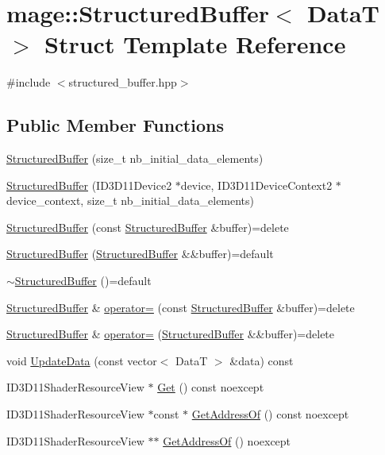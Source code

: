\hypertarget{structmage_1_1_structured_buffer}{}\section{mage\+:\+:Structured\+Buffer$<$ DataT $>$ Struct Template Reference}
\label{structmage_1_1_structured_buffer}


{\ttfamily \#include $<$structured\+\_\+buffer.\+hpp$>$}

\subsection*{Public Member Functions}
\begin{DoxyCompactItemize}
\item 
\hyperlink{structmage_1_1_structured_buffer_ad384318eca9a617f61f81472ea68f32e}{Structured\+Buffer} (size\+\_\+t nb\+\_\+initial\+\_\+data\+\_\+elements)
\item 
\hyperlink{structmage_1_1_structured_buffer_a9ba747c0666b96c17e3711266ee74aa0}{Structured\+Buffer} (I\+D3\+D11\+Device2 $\ast$device, I\+D3\+D11\+Device\+Context2 $\ast$device\+\_\+context, size\+\_\+t nb\+\_\+initial\+\_\+data\+\_\+elements)
\item 
\hyperlink{structmage_1_1_structured_buffer_aa017416099a12305d0177094c768150e}{Structured\+Buffer} (const \hyperlink{structmage_1_1_structured_buffer}{Structured\+Buffer} \&buffer)=delete
\item 
\hyperlink{structmage_1_1_structured_buffer_a455bd930f39f5fdf6af4f453694997da}{Structured\+Buffer} (\hyperlink{structmage_1_1_structured_buffer}{Structured\+Buffer} \&\&buffer)=default
\item 
\hyperlink{structmage_1_1_structured_buffer_a02ab1d322e1aef0c608b85224b80dbcf}{$\sim$\+Structured\+Buffer} ()=default
\item 
\hyperlink{structmage_1_1_structured_buffer}{Structured\+Buffer} \& \hyperlink{structmage_1_1_structured_buffer_ac00255155ab1eb61244392adcf262d40}{operator=} (const \hyperlink{structmage_1_1_structured_buffer}{Structured\+Buffer} \&buffer)=delete
\item 
\hyperlink{structmage_1_1_structured_buffer}{Structured\+Buffer} \& \hyperlink{structmage_1_1_structured_buffer_a2647510e153d15b89f860e2a5c68e231}{operator=} (\hyperlink{structmage_1_1_structured_buffer}{Structured\+Buffer} \&\&buffer)=delete
\item 
void \hyperlink{structmage_1_1_structured_buffer_aac2597ea7ee586207bf4918c3b4f9798}{Update\+Data} (const vector$<$ DataT $>$ \&data) const
\item 
I\+D3\+D11\+Shader\+Resource\+View $\ast$ \hyperlink{structmage_1_1_structured_buffer_ad933738bc55b10aea665913a8215bab0}{Get} () const noexcept
\item 
I\+D3\+D11\+Shader\+Resource\+View $\ast$const  $\ast$ \hyperlink{structmage_1_1_structured_buffer_a116faa593af2b0872cb266eabe6b58a8}{Get\+Address\+Of} () const noexcept
\item 
I\+D3\+D11\+Shader\+Resource\+View $\ast$$\ast$ \hyperlink{structmage_1_1_structured_buffer_a1e05bab8441b847c5b7cd11e2f5003e7}{Get\+Address\+Of} () noexcept
\end{DoxyCompactItemize}

